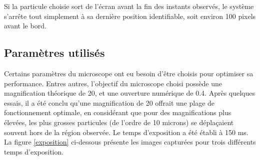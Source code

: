 \documentclass[11pt,letterpaper]{article}
\begin{document}
Si la particule choisie sort de l'écran avant la fin des instants observés, le système s'arrête tout simplement à 
sa dernière position identifiable, soit environ 100 pixels avant le bord.

\subsection{Paramètres utilisés \label{para}}
Certains paramètres du microscope ont eu besoin d'être choisis pour optimiser sa performance. Entres autres,
l'objectif du microscope choisi possède une magnification théorique de 20, et une ouverture numérique de 0.4. Après quelques essais, 
il a été conclu qu'une magnification de 20 offrait une plage de fonctionnement optimale, en considérant 
que pour des magnifications plus élevées, les plus grosses particules (de l'ordre de 10 microns) se déplaçaient souvent hors de la région observée. 
Le temps d'exposition a été établi à 150 ms. La figure \ref{exposition} ci-dessous présente les images
capturées pour trois différents temps d'exposition.
\end{document}
